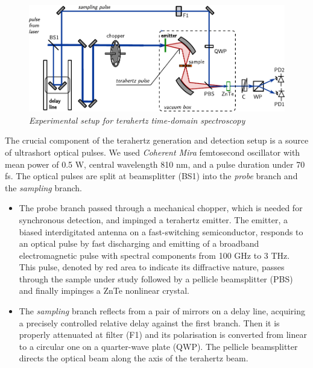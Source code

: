\begin{figure}[ht] \caption{\textit{Experimental setup for terahertz time-domain spectroscopy}} \label{fg_exp} \centering 
	\includegraphics[width=12cm]{img/exp_THz_sampling.pdf}
\end{figure}

The crucial component of the terahertz generation and detection setup is a source of ultrashort optical pulses. We used \textit{Coherent Mira} femtosecond oscillator with mean power of 0.5 W, central wavelength 810 nm,  and a pulse duration under 70 fs. The optical pulses are split at beamsplitter (BS1) into the \textit{probe} branch and the \textit{sampling} branch. 
\begin{itemize}
 \item{The probe branch passed through a mechanical chopper, which is needed for synchronous detection, and impinged a terahertz emitter. The emitter, a biased interdigitated antenna on a fast-switching semiconductor, responds to an optical pulse by fast discharging and emitting of a broadband electromagnetic pulse with spectral components from 100 GHz to 3 THz. This pulse, denoted by red area to indicate its diffractive nature, passes through the sample under study followed by a pellicle beamsplitter (PBS) and finally impinges a ZnTe nonlinear crystal. } 
 \item{The \textit{sampling} branch reflects from a pair of mirrors on a delay line, acquiring a precisely controlled relative delay against the first branch. Then it is properly attenuated at filter (F1) and its polarisation is converted from linear to a circular one on a quarter-wave plate (QWP). The pellicle beamsplitter directs the optical beam along the axis of the terahertz beam.} 
\end{itemize}
